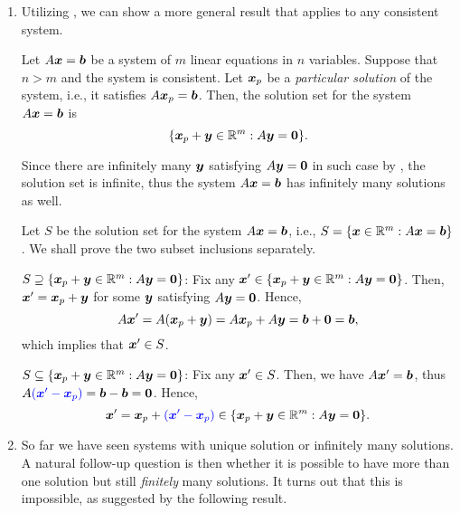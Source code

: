 \begin{enumerate}
\item Utilizing , we can show a more
general result that applies to any consistent system.

\begin{proposition}
\label{prp:var-more-than-eqs-sol-set}
Let \(A\vb*{x}=\vb*{b}\) be a system of \(m\) linear equations in \(n\)
variables. Suppose that \(n>m\) and the system is consistent. Let
\(\vb*{x}_p\) be a \emph{particular solution} of the system, i.e., it
satisfies \(A\vb*{x}_p=\vb*{b}\). Then, the solution set for the system
\(A\vb*{x}=\vb*{b}\) is
\[
\{\vb*{x}_p+\vb*{y}\in\mathbb{R}^m:A\vb*{y}=\vb*{0}\}.
\]
\end{proposition}
\begin{note}
Since there are infinitely many \(\vb*{y}\) satisfying \(A\vb*{y}=\vb*{0}\)
in such case by , the solution set is
infinite, thus the system \(A\vb*{x}=\vb*{b}\) has infinitely many solutions
as well.
\end{note}

\begin{pf}
Let \(S\) be the solution set for the system \(A\vb*{x}=\vb*{b}\), i.e.,
\(S=\{\vb*{x}\in\mathbb{R}^m:A\vb*{x}=\vb*{b}\}\). We shall prove the two subset
inclusions separately.

\underline{\(S\supseteq \{\vb*{x}_p+\vb*{y}\in\mathbb{R}^m:A\vb*{y}=\vb*{0}\}\)}:
Fix any \(\vb*{x}'\in\{\vb*{x}_p+\vb*{y}\in\mathbb{R}^m:A\vb*{y}=\vb*{0}\}\). Then,
\(\vb*{x}'=\vb*{x}_p+\vb*{y}\) for some \(\vb*{y}\) satisfying
\(A\vb*{y}=\vb*{0}\). Hence,
\[
A\vb*{x}'=A(\vb*{x}_p+\vb*{y})=A\vb*{x}_p+A\vb*{y}=\vb*{b}+\vb*{0}=\vb*{b},
\]
which implies that \(\vb*{x}'\in S\).

\underline{\(S\subseteq \{\vb*{x}_p+\vb*{y}\in\mathbb{R}^m:A\vb*{y}=\vb*{0}\}\)}:
Fix any \(\vb*{x}'\in S\). Then, we have \(A\vb*{x}'=\vb*{b}\), thus
\(A{\color{blue}(\vb*{x}'-\vb*{x}_p)}=\vb*{b}-\vb*{b}=\vb*{0}\). Hence,
\[
\vb*{x}'=\vb*{x}_p+{\color{blue}(\vb*{x}'-\vb*{x}_p)}
\in\{\vb*{x}_p+\vb*{y}\in\mathbb{R}^m:A\vb*{y}=\vb*{0}\}.
\]
\end{pf}

\item So far we have seen systems with unique solution or infinitely many
solutions. A natural follow-up question is then whether it is possible to have
more than one solution but still \emph{finitely} many solutions. It turns out
that this is impossible, as suggested by the following result.


\end{enumerate}
